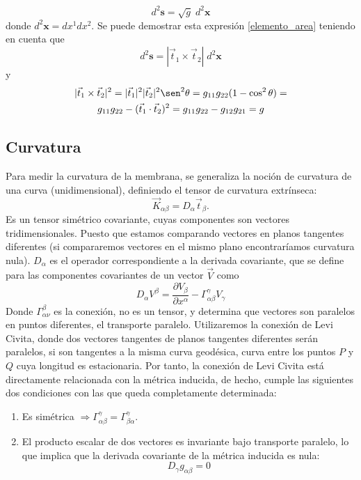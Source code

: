 \begin{equation}\label{elemento_area}
d^2\mathbf{s}=\sqrt{g}\;d^2\mathbf{x}
\end{equation}
donde $d^2\mathbf{x}=dx^1dx^2$. Se puede demostrar esta expresión
\eqref{elemento_area} teniendo en cuenta que
\begin{equation*}
d^2\mathbf{s}=|\vec{t}_1\times\vec{t}_2|\;d^2\mathbf{x}
\end{equation*}
y
\begin{multline*}
|\vec{t}_1\times\vec{t}_2|^2=|\vec{t}_1|^2|\vec{t}_2|^2\sen^2
\theta=g_{11}g_{22}(1-\cos^2 \theta)=\\
g_{11}g_{22}-(\vec{t}_1\cdot\vec{t}_2)^2=g_{11}g_{22}-g_{12}g_{21}=g
\end{multline*}

\subsection{Curvatura}

Para medir la curvatura de la membrana, se generaliza la noción de curvatura
de una curva (unidimensional), definiendo el tensor de curvatura extrínseca:
\begin{equation}
\vec{K}_{\alpha\beta}=D_{\alpha}\vec{t}_{\beta}.
\end{equation}
Es un tensor simétrico covariante, cuyas componentes son vectores
tridimensionales. Puesto que estamos comparando vectores en planos tangentes
diferentes (si compararemos vectores en el mismo plano encontraríamos
curvatura nula). $D_{\alpha}$ es el operador correspondiente a la derivada
covariante, que se define para las componentes covariantes de un vector $\vec{V}$ como
\begin{equation}
D_{\alpha}V^{\beta}=\frac{\partial V_{\beta}}{\partial x^{\alpha}}-\Gamma^{\gamma}_{\alpha\beta}V_{\gamma}
\end{equation}
Donde $\Gamma^{\beta}_{\alpha\nu}$ es la conexión, no es un tensor, y
determina que vectores son paralelos en puntos diferentes, el transporte
paralelo. Utilizaremos la conexión de Levi Civita, donde dos vectores
tangentes de planos tangentes diferentes serán paralelos, si son tangentes a la
misma curva geodésica, curva entre los puntos $P$ y $Q$ cuya longitud es
estacionaria. Por tanto, la conexión de Levi Civita está directamente
relacionada con la métrica inducida, de hecho, cumple las siguientes dos condiciones
con las que queda completamente determinada:
\begin{enumerate}
\item Es simétrica $\Rightarrow
  \Gamma^{\gamma}_{\alpha\beta}=\Gamma^{\gamma}_{\beta\alpha}$.
\item El producto escalar de dos vectores es invariante bajo transporte
  paralelo, lo que implica que la derivada covariante de la métrica inducida
  es nula: 
  \begin{equation}
    D_{\gamma}g_{\alpha\beta}=0
  \end{equation}
\end{enumerate}

